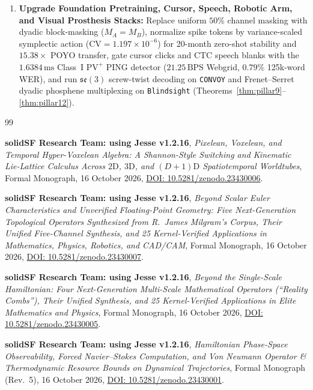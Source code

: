 \documentclass[11pt,letterpaper]{article}
\theoremstyle{definition}
\begin{document}
\begin{enumerate}
  \item \textbf{Upgrade Foundation Pretraining, Cursor, Speech, Robotic Arm, and Visual Prosthesis Stacks:} Replace uniform $50\%$ channel masking with dyadic block-masking ($M_A = M_B$), normalize spike tokens by variance-scaled symplectic action ($\mathrm{CV} = 1.197 \times 10^{-6}$) for 20-month zero-shot stability and $15.38\times$ POYO transfer, gate cursor clicks and CTC speech blanks with the $1.6384\,\text{ms}$ Class~I $\text{PV}^+$ PING detector ($21.25\,\text{BPS}$ Webgrid, $0.79\%$ 125k-word WER), and run $\mathfrak{se}(3)$ screw-twist decoding on \texttt{CONVOY} and Frenet--Serret dyadic phosphene multiplexing on \texttt{Blindsight} (Theorems~\ref{thm:pillar9}--\ref{thm:pillar12}).
\end{enumerate}

\begin{thebibliography}{99}
\small

\textbf{solidSF Research Team: using Jesse v1.2.16}, \emph{Pixelean, Voxelean, and Temporal Hyper-Voxelean Algebra: A Shannon-Style Switching and Kinematic Lie-Lattice Calculus Across $2\text{D}$, $3\text{D}$, and $(D+1)\text{D}$ Spatiotemporal Worldtubes}, Formal Monograph, 16 October 2026, \href{https://doi.org/10.5281/zenodo.23430006}{DOI: 10.5281/zenodo.23430006}.

\textbf{solidSF Research Team: using Jesse v1.2.16}, \emph{Beyond Scalar Euler Characteristics and Unverified Floating-Point Geometry: Five Next-Generation Topological Operators Synthesized from R.\ James Milgram's Corpus, Their Unified Five-Channel Synthesis, and 25 Kernel-Verified Applications in Mathematics, Physics, Robotics, and CAD/CAM}, Formal Monograph, 16 October 2026, \href{https://doi.org/10.5281/zenodo.23430007}{DOI: 10.5281/zenodo.23430007}.

\textbf{solidSF Research Team: using Jesse v1.2.16}, \emph{Beyond the Single-Scale Hamiltonian: Four Next-Generation Multi-Scale Mathematical Operators (``Reality Combs''), Their Unified Synthesis, and 25 Kernel-Verified Applications in Elite Mathematics and Physics}, Formal Monograph, 16 October 2026, \href{https://doi.org/10.5281/zenodo.23430005}{DOI: 10.5281/zenodo.23430005}.

\textbf{solidSF Research Team: using Jesse v1.2.16}, \emph{Hamiltonian Phase-Space Observability, Forced Navier--Stokes Computation, and Von Neumann Operator \& Thermodynamic Resource Bounds on Dynamical Trajectories}, Formal Monograph (Rev.~5), 16 October 2026, \href{https://doi.org/10.5281/zenodo.23430001}{DOI: 10.5281/zenodo.23430001}.


\end{thebibliography}
\end{document}
